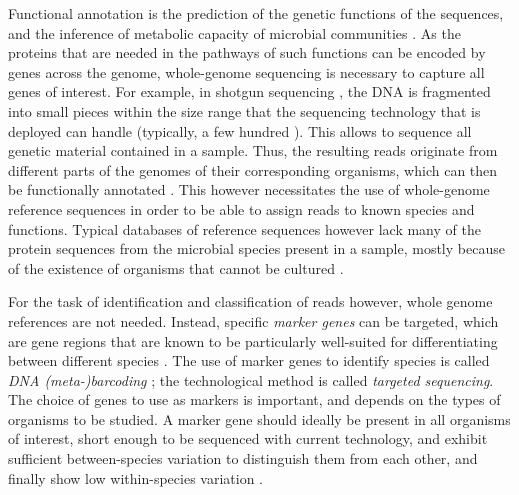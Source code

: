 Functional annotation \cite{Stein2001} is the prediction of the genetic functions of the sequences,
and the inference of metabolic capacity of microbial communities \cite{Brown2017}.
As the proteins that are needed in the pathways of such functions can be encoded by genes across the genome,
whole-genome sequencing is necessary to capture all genes of interest.
For example, in shotgun sequencing \cite{Staden1979,Anderson1981},
the \ac{DNA} is fragmented into small pieces within the size range that the sequencing technology that is deployed can handle
(typically, a few hundred \si{\basepair}).
This allows to sequence all genetic material contained in a sample.
Thus, the resulting reads originate from different parts of the genomes of their corresponding organisms,
which can then be functionally annotated \cite{Glass2010}.
This however necessitates the use of whole-genome reference sequences
in order to be able to assign reads to known species and functions.
Typical databases of reference sequences however
lack many of the protein sequences from the microbial species present in a sample,
mostly because of the existence of organisms that cannot be cultured \cite{Brown2017}.

For the task of identification and classification of reads however, whole genome references are not needed.
Instead, specific \emph{marker genes} can be targeted,
which are gene regions that are known to be
particularly well-suited for differentiating between different species \cite{Ren2016}.
The use of marker genes to identify species is called \emph{DNA (meta-)barcoding} \cite{Hebert2003,Savolainen2005,Deiner2017b};
the technological method is called \emph{targeted sequencing}.
The choice of genes to use as markers is important, and depends on the types of organisms to be studied.
A marker gene should ideally be present in all organisms of interest,
short enough to be sequenced with current technology,
and exhibit sufficient between-species variation to distinguish them from each other,
and finally show low within-species variation \cite{Kress2008}.

